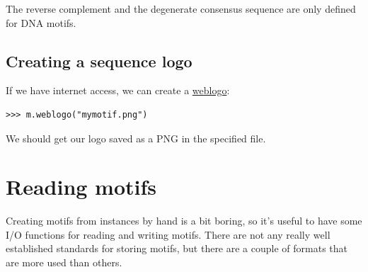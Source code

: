 \documentclass{report}
\begin{document}
The reverse complement and the degenerate consensus sequence are
only defined for DNA motifs.

\subsection{Creating a sequence logo}
If we have internet access, we can create a \href{http://weblogo.berkeley.edu}{weblogo}:
\begin{verbatim}
>>> m.weblogo("mymotif.png")
\end{verbatim}
We should get our logo saved as a PNG in the specified file.

\section{Reading motifs}
\label{sec:io}

Creating motifs from instances by hand is a bit boring, so it's
useful to have some I/O functions for reading and writing
motifs. There are not any really well established standards for storing
motifs, but there are a couple of formats that are more used than
others.
\end{document}
